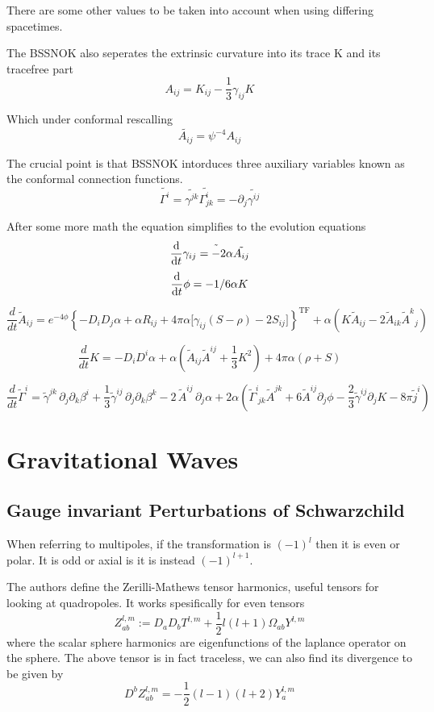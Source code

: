 There are some other values to be taken into account when using differing spacetimes.

The BSSNOK also seperates the extrinsic curvature into its trace K and its tracefree part
\[
A_{ij} = K_{ij} - \frac{1}{3}\gamma_{ij}K
  \]

  Which under conformal rescalling
\[
\tilde{A_{ij}} = \psi^{-4}A_{ij}
  \]

  The crucial point is that BSSNOK intorduces three auxiliary variables known as the conformal connection functions.
\[
\tilde{\Gamma^i} = \tilde{\gamma^{jk}} \tilde{\Gamma^i_{jk}} = - \partial_j \tilde{\gamma^{ij}}
  \]


  After some more math the equation simplifies to the evolution equations
\[
\dv{t}\tilde{\gamma_{ij} = -2\alpha \tilde{A_{ij}}}
  \]
\[
\dv{t} \phi = -1/6 \alpha K
  \]

  \[
\frac{d}{dt}\tilde{A}_{ij}
= e^{-4\phi}
\left\{
 -D_i D_j \alpha
 + \alpha R_{ij}
 + 4\pi\alpha\big[\gamma_{ij}(S-\rho) - 2S_{ij}\big]
\right\}^{\mathrm{TF}}
+ \alpha\left(K\tilde{A}_{ij} - 2\tilde{A}_{ik}\tilde{A}^{k}{}_{j}\right)
\]





\[
\frac{d}{dt}K
= -D_i D^i \alpha
+ \alpha\left(\tilde{A}_{ij}\tilde{A}^{ij} + \frac{1}{3}K^2\right)
+ 4\pi\alpha(\rho + S)
\]



\[
\frac{d}{dt}\tilde{\Gamma}^i
= \tilde{\gamma}^{jk}\,\partial_j\partial_k \beta^i
 + \frac{1}{3}\tilde{\gamma}^{ij}\,\partial_j\partial_k \beta^k
 - 2\,\tilde{A}^{ij}\,\partial_j \alpha
 + 2\alpha\left(
     \tilde{\Gamma}^i_{\;jk}\tilde{A}^{jk}
     + 6\tilde{A}^{ij}\partial_j\phi
     - \frac{2}{3}\tilde{\gamma}^{ij}\partial_j K
     - 8\pi\tilde{j}^i
   \right)
\]

\section{Gravitational Waves}

\subsection{Gauge invariant Perturbations of Schwarzchild}

When referring to multipoles, if the transformation is $(-1)^l$ then it is even or polar. It is odd or axial is it is instead $(-1)^{l+1}$.

The authors define the Zerilli-Mathews tensor harmonics, useful tensors for looking at quadropoles. It works spesifically for even tensors
\[
Z^{l,m}_{ab} := D_aD_b T^{l,m} + \frac{1}{2}l(l+1) \Omega_{ab}Y^{l,m}
  \]
  where the scalar sphere harmonics are eigenfunctions of the laplance operator on the sphere. The above tensor is in fact traceless, we can also find its divergence to be given by
\[
D^b Z^{l,m}_{ab} = -\frac{1}{2}(l-1)(l+2)Y^{l,m}_a
  \]

